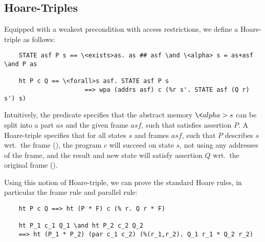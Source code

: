 \documentclass[runningheads]{llncs}
\begin{document}
  \subsection{Hoare-Triples}
  Equipped with a weakest precondition with access restrictions, we define a Hoare-triple as follows:
  \begin{lstlisting}
    STATE asf P s == \<exists>as. as ## asf \and \<alpha> s = as+asf \and P as

    ht P c Q == \<forall>s asf. STATE asf P s
                      ==> wpa (addrs asf) c (%r s'. STATE asf (Q r) s') s)
  \end{lstlisting}
  Intuitively, the predicate  specifies that the abstract memory \is$\<alpha> s$ can be
  split into a part \is$as$ and the given frame \is$asf$, such that  satisfies assertion $P$.
  A Hoare-triple specifies that for all states \is$s$ and frames \is$asf$,
  such that \is$P$ describes \is$s$ wrt.\ the frame (), the program \is$c$ will succeed
  on state \is$s$, not using any addresses of the frame, and the result and new state will satisfy
  assertion \is$Q$ wrt.\ the original frame ().

  Using this notion of Hoare-triple, we can prove the standard Hoare rules, in particular
  the frame rule and parallel rule:
  \begin{lstlisting}
    ht P c Q ==> ht (P * F) c (% r. Q r * F)

    ht P_1 c_1 Q_1 \and ht P_2 c_2 Q_2
    ==> ht (P_1 * P_2) (par c_1 c_2) (%(r_1,r_2). Q_1 r_1 * Q_2 r_2)
  \end{lstlisting}
\end{document}
